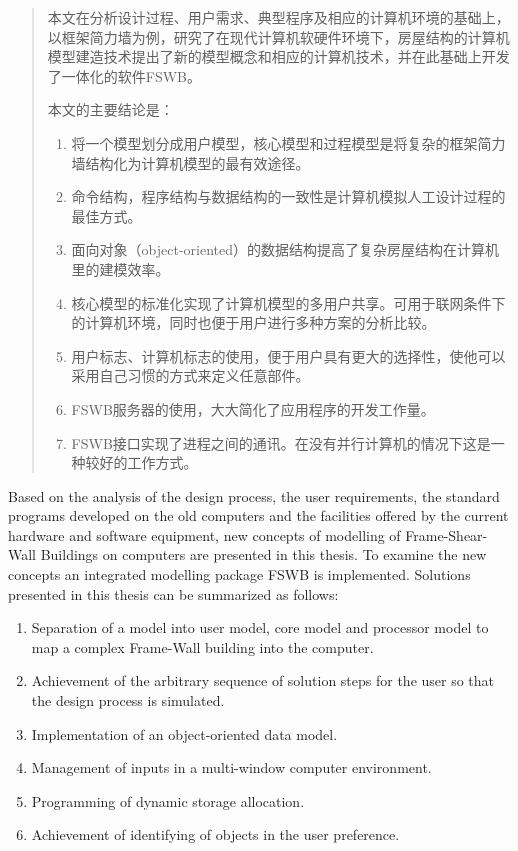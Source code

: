 \documentclass[degree=postdoc]{thuthesis}
\begin{document}
\START
\showoutput

\frontmatter

\begin{abstract}
  本文在分析设计过程、用户需求、典型程序及相应的计算机环境的基础上，以框架简力墙为例，研究了在现代计算机软硬件环境下，房屋结构的计算机模型建造技术提出了新的模型概念和相应的计算机技术，并在此基础上开发了一体化的软件FSWB。

  本文的主要结论是：
  \begin{enumerate}
    \item 将一个模型划分成用户模型，核心模型和过程模型是将复杂的框架简力墙结构化为计算机模型的最有效途径。
    \item 命令结构，程序结构与数据结构的一致性是计算机模拟人工设计过程的最佳方式。
    \item 面向对象（object-oriented）的数据结构提高了复杂房屋结构在计算机里的建模效率。
    \item 核心模型的标准化实现了计算机模型的多用户共享。可用于联网条件下的计算机环境，同时也便于用户进行多种方案的分析比较。
    \item 用户标志、计算机标志的使用，便于用户具有更大的选择性，使他可以采用自己习惯的方式来定义任意部件。
    \item FSWB服务器的使用，大大简化了应用程序的开发工作量。
    \item FSWB接口实现了进程之间的通讯。在没有并行计算机的情况下这是一种较好的工作方式。
  \end{enumerate}

\end{abstract}

\begin{abstract*}
  Based on the analysis of the design process, the user requirements, the standard programs developed on the old computers and the facilities offered by the current hardware and software equipment, new concepts of modelling of Frame-Shear-Wall Buildings on computers are presented in this thesis.
  To examine the new concepts an integrated modelling package FSWB is implemented.
  Solutions presented in this thesis can be summarized as follows:
  \begin{enumerate}
    \item Separation of a model into user model, core model and processor model to map a complex Frame-Wall building into the computer.
    \item Achievement of the arbitrary sequence of solution steps for the user so that the design process is simulated.
    \item Implementation of an object-oriented data model.
    \item Management of inputs in a multi-window computer environment.
    \item Programming of dynamic storage allocation.
    \item Achievement of identifying of objects in the user preference.
  \end{enumerate}

\end{abstract*}
\end{document}
